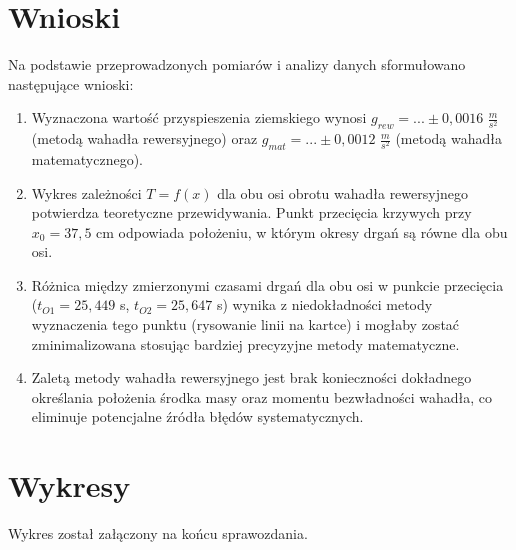 \documentclass[a4paper,12pt]{article}
\begin{document}
\section{Wnioski}


Na podstawie przeprowadzonych pomiarów i analizy danych sformułowano następujące wnioski:

\begin{enumerate}
    \item Wyznaczona wartość przyspieszenia ziemskiego wynosi $g_{rew} = ... \pm 0,0016$ $\frac{m}{s^2}$ (metodą wahadła rewersyjnego) oraz $g_{mat} = ... \pm 0,0012$ $\frac{m}{s^2}$ (metodą wahadła matematycznego).
    
    
    \item Wykres zależności $T=f(x)$ dla obu osi obrotu wahadła rewersyjnego potwierdza teoretyczne przewidywania. Punkt przecięcia krzywych przy $x_0 = 37,5$ cm odpowiada położeniu, w którym okresy drgań są równe dla obu osi.
    
    \item Różnica między zmierzonymi czasami drgań dla obu osi w punkcie przecięcia ($t_{O1} = 25,449$ s, $t_{O2} = 25,647$ s) wynika z niedokładności metody wyznaczenia tego punktu (rysowanie linii na kartce) i mogłaby zostać zminimalizowana stosując bardziej precyzyjne metody matematyczne.
    
    \item Zaletą metody wahadła rewersyjnego jest brak konieczności dokładnego określania położenia środka masy oraz momentu bezwładności wahadła, co eliminuje potencjalne źródła błędów systematycznych.
\end{enumerate}

\section{Wykresy}

Wykres został załączony na końcu sprawozdania.



\end{document}
